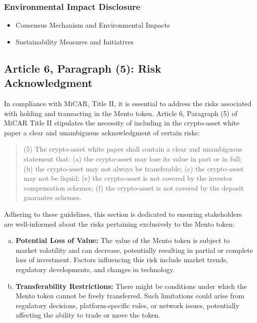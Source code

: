 \documentclass[a4paper]{article}
\theoremstyle{definition}
\begin{document}
\begin{appendices}
\subsubsection{Environmental Impact Disclosure}
\begin{itemize}
    \item Consensus Mechanism and Environmental Impacts
    \item Sustainability Measures and Initiatives
\end{itemize}



\subsection{Article 6, Paragraph (5): Risk Acknowledgment}
In compliance with MiCAR, Title II, it is essential to address the risks associated with holding and transacting in the Mento token. Article 6, Paragraph (5) of MiCAR Title II stipulates the necessity of including in the crypto-asset white paper a clear and unambiguous acknowledgment of certain risks:

\begin{quote}
(5) The crypto-asset white paper shall contain a clear and unambiguous statement that: (a) the crypto-asset may lose its value in part or in full; (b) the crypto-asset may not always be transferable; (c) the crypto-asset may not be liquid; (e) the crypto-asset is not covered by the investor compensation schemes; (f) the crypto-asset is not covered by the deposit guarantee schemes.    
\end{quote}

Adhering to these guidelines, this section is dedicated to ensuring stakeholders are well-informed about the risks pertaining exclusively to the Mento token:

\begin{enumerate}[(a)]
    \item \textbf{Potential Loss of Value:} The value of the Mento token is subject to market volatility and can decrease, potentially resulting in partial or complete loss of investment. Factors influencing this risk include market trends, regulatory developments, and changes in technology.
    
    \item \textbf{Transferability Restrictions:} There might be conditions under which the Mento token cannot be freely transferred. Such limitations could arise from regulatory decisions, platform-specific rules, or network issues, potentially affecting the ability to trade or move the token.
    

\end{enumerate}
\end{appendices}
\end{document}
